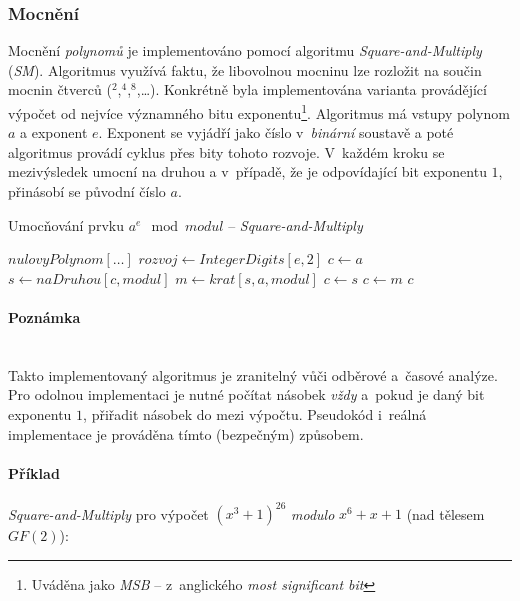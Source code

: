 \documentclass[thesis=M,czech,hidelinks]{FITthesis}[2012/06/26]
\newcommand{\0}{{\textcolor[gray]{0.80}{0}}}
\newenvironment{algoritmus}{
    \floatname{algorithm}{Algoritmus}
    \begin{algorithm}
}{\end{algorithm}}
\begin{document}
\subsubsection{Mocnění}
Mocnění \emph{polynomů} je implementováno pomocí algoritmu
\emph{Square-and-Multiply} (\emph{SM}). Algoritmus využívá faktu, že libovolnou
mocninu lze rozložit na součin mocnin čtverců ($^2$,$^4$,$^8$,\dots). Konkrétně
byla implementována varianta provádějící výpočet od nejvíce významného bitu
exponentu\footnote{
    Uváděna jako \emph{MSB} -- z~anglického \emph{most significant bit}
}. Algoritmus má vstupy polynom $a$ a exponent $e$. Exponent se vyjádří jako
číslo v~\emph{binární} soustavě a poté algoritmus provádí cyklus přes bity
tohoto rozvoje. V~každém kroku se mezivýsledek umocní na druhou a v~případě, že
je odpovídající bit exponentu $1$, přinásobí se původní číslo $a$.


\begin{algoritmus}[!ht]
    \caption{Umocňování prvku $a^e \mod modul$ -- \emph{Square-and-Multiply}}
    \begin{algorithmic}[1]
            \State \Return $nulovyPolynom[\ldots]$
        \EndIf
        \State $ rozvoj \gets IntegerDigits[ e, 2 ] $
        \State $ c \gets a $
            \State $ s \gets naDruhou[ c, modul ] $
            \State $ m \gets krat[ s, a, modul ] $
                \State $ c \gets s $
            \Else
                \State $ c \gets m $
            \EndIf
        \EndFor
        \State \Return $c$
     \EndFunction
    \end{algorithmic}
\end{algoritmus}


\paragraph{Poznámka} \hfil \\
Takto implementovaný algoritmus je zranitelný vůči odběrové a~časové analýze.
Pro odolnou implementaci je nutné počítat násobek \emph{vždy} a~pokud je daný
bit exponentu $1$, přiřadit násobek do mezi výpočtu. Pseudokód i~reálná
implementace je prováděna tímto (bezpečným) způsobem.

\paragraph{Příklad} \emph{Square-and-Multiply} pro výpočet
$\left(x^3+1\right)^{26}$ \emph{modulo} $x^6+x+1$ (nad tělesem $GF(2)$):
\end{document}
